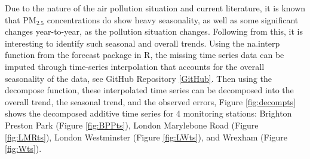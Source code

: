 Due to the nature of the air pollution situation and current literature, it is known that PM$_{2.5}$ concentrations do show heavy seasonality, as well as some significant changes year-to-year, as the pollution situation changes. Following from this, it is interesting to identify such seasonal and overall trends. Using the na.interp function from the forecast package in R, the missing time series data can be imputed through time-series interpolation that accounts for the overall seasonality of the data, see GitHub Repository \ref{GitHub}. Then using the decompose function, these interpolated time series can be decomposed into the overall trend, the seasonal trend, and the observed errors, Figure \ref{fig:decompts} shows the decomposed additive time series for 4 monitoring stations: Brighton Preston Park (Figure \ref{fig:BPPts}), London Marylebone Road (Figure \ref{fig:LMRts}), London Westminster (Figure \ref{fig:LWts}), and Wrexham (Figure \ref{fig:Wts}).

